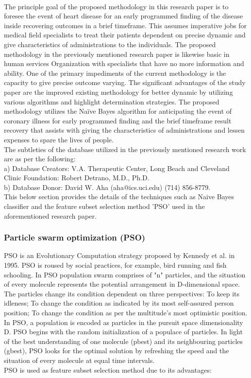 \documentclass[oneside,12pt]{Classes/VTU}
\begin{document}
    \paragraph{}
    The principle goal of the proposed methodology in this research paper is to foresee the event of heart disease for an early programmed finding of the disease inside recovering outcomes in a brief timeframe. This assumes imperative jobs for medical field specialists to treat their patients dependent on precise dynamic and give characteristics of administrations to the individuals. The proposed methodology in the previously mentioned research paper is likewise basic in human services Organization with specialists that have no more information and ability. One of the primary impediments of the current methodology is the capacity to give precise outcome varying. The significant advantages of the study paper are the improved existing methodology for better dynamic by utilizing various algorithms and highlight determination strategies. The proposed methodology utilizes the Naïve Bayes algorithm for anticipating the event of coronary illness for early programmed finding and the brief timeframe result recovery that assists with giving the characteristics of administrations and lessen expenses to spare the lives of people.
    \\
    The subtleties of the database utilized in the previously mentioned research work are as per the following:
    \\
    a) Database Creators: V.A. Therapeutic Center, Long Beach and Cleveland Clinic Foundation: Robert Detrano, M.D., Ph.D.
    \\
    b) Database Donor: David W. Aha (aha@ics.uci.edu) (714) 856-8779.
    \\
    This below section provides the details of the techniques such as Naive Bayes classifier and the feature subset selection method 'PSO' used in the aforementioned research paper.
    \subsubsection{Particle swarm optimization (PSO)}           
    PSO is an Evolutionary Computation strategy proposed by Kennedy et al. in 1995. PSO is roused by social practices, for example, bird running and fish schooling. In PSO population swarm comprises of "n" particles, and the situation of every molecule represents the potential arrangement in D-dimensional space. The particles change its condition dependent on three perspectives: To keep its idleness; To change the condition as indicated by its most self-assured person position; To change the condition as per the multitude's most optimistic position. In PSO, a population is encoded as particles in the pursuit space dimensionality D. PSO begins with the random initialization of a populace of particles. In light of the best understanding of one molecule (pbest) and its neighbouring particles (gbest), PSO looks for the optimal solution by refreshing the speed and the situation of every molecule at equal time intervals.
    \\
    PSO is used as feature subset selection method due to its advantages:
    
\end{document}
